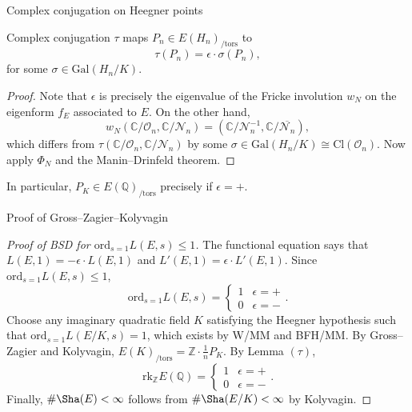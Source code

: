 \documentclass[10pt]{beamer}
\begin{document}
\begin{frame}[t]{Complex conjugation on Heegner points}

\begin{lemma}[$ \tau $]
Complex conjugation $ \tau $ maps $ P_n \in E(H_n)_{/ \mathrm{tors}} $ to
$$ \tau(P_n) = \epsilon \cdot \sigma(P_n), $$
for some $ \sigma \in \mathrm{Gal}(H_n / K) $.
\end{lemma}

\begin{proof}
Note that $ \epsilon $ is precisely the eigenvalue of the Fricke involution $ w_N $ on the eigenform $ f_E $ associated to $ E $. On the other hand,
$$ w_N(\mathbb{C} / \mathcal{O}_n, \mathbb{C} / \mathcal{N}_n) = (\mathbb{C} / \mathcal{N}_n^{-1}, \mathbb{C} / \overline{\mathcal{N}_n}), $$
which differs from $ \tau(\mathbb{C} / \mathcal{O}_n, \mathbb{C} / \mathcal{N}_n) $ by some $ \sigma \in \mathrm{Gal}(H_n / K) \cong \mathrm{Cl}(\mathcal{O}_n) $. Now apply $ \Phi_N $ and the Manin--Drinfeld theorem.
\end{proof}

\vspace{0.5cm} In particular, $ P_K \in E(\mathbb{Q})_{/ \mathrm{tors}} $ precisely if $ \epsilon = + $.

\end{frame}

\begin{frame}[t]{Proof of Gross--Zagier--Kolyvagin}

\begin{proof}[Proof of BSD for $ \mathrm{ord}_{s = 1} L(E, s) \le 1 $]
The functional equation says that $ L(E, 1) = -\epsilon \cdot L(E, 1) $ and $ L'(E, 1) = \epsilon \cdot L'(E, 1) $. Since $ \mathrm{ord}_{s = 1} L(E, s) \le 1 $,
$$ \mathrm{ord}_{s = 1} L(E, s) = \begin{cases} 1 & \epsilon = + \\ 0 & \epsilon = - \end{cases}. $$
Choose any imaginary quadratic field $ K $ satisfying the Heegner hypothesis such that $ \mathrm{ord}_{s = 1} L(E / K, s) = 1 $, which exists by W/MM and BFH/MM. By Gross--Zagier and Kolyvagin, $ E(K)_{/ \mathrm{tors}} = \mathbb{Z} \cdot \tfrac{1}{n}P_K $. By Lemma $ (\tau) $,
$$ \mathrm{rk}_\mathbb{Z} E(\mathbb{Q}) = \begin{cases} 1 & \epsilon = + \\ 0 & \epsilon = - \end{cases}. $$
Finally, $ \#\Sha(E) < \infty $ follows from $ \#\Sha(E / K) < \infty $ by Kolyvagin.
\end{proof}

\end{frame}
\end{document}
